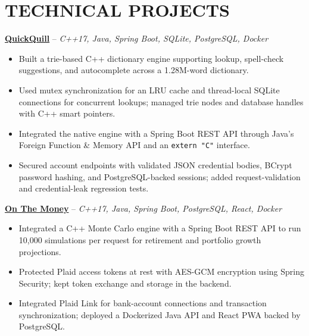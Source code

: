 \documentclass[10pt,letterpaper]{article}
\begin{document}
\section*{TECHNICAL PROJECTS}
\textbf{\href{https://github.com/nickczak/QuickQuill-Dictionary-SpellChecker}{QuickQuill}} -- \textit{C++17, Java, Spring Boot, SQLite, PostgreSQL, Docker}
\begin{itemize}
  \item Built a trie-based C++ dictionary engine supporting lookup, spell-check suggestions, and autocomplete across a 1.28M-word dictionary.
  \item Used mutex synchronization for an LRU cache and thread-local SQLite connections for concurrent lookups; managed trie nodes and database handles with C++ smart pointers.
  \item Integrated the native engine with a Spring Boot REST API through Java's Foreign Function \& Memory API and an \texttt{extern "C"} interface.
  \item Secured account endpoints with validated JSON credential bodies, BCrypt password hashing, and PostgreSQL-backed sessions; added request-validation and credential-leak regression tests.
\end{itemize}

\textbf{\href{https://github.com/nickczak/OnTheMoney-Finance-Tracker}{On The Money}} -- \textit{C++17, Java, Spring Boot, PostgreSQL, React, Docker}
\begin{itemize}
  \item Integrated a C++ Monte Carlo engine with a Spring Boot REST API to run 10,000 simulations per request for retirement and portfolio growth projections.
  \item Protected Plaid access tokens at rest with AES-GCM encryption using Spring Security; kept token exchange and storage in the backend.
  \item Integrated Plaid Link for bank-account connections and transaction synchronization; deployed a Dockerized Java API and React PWA backed by PostgreSQL.
\end{itemize}
\end{document}
